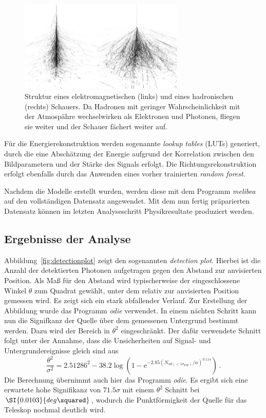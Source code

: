 \begin{figure}
  \centering
  \includegraphics[width=0.7\textwidth]{figures/gamma_hadron.png}
  \caption{Struktur eines elektromagnetischen (links) und eines hadronischen
  (rechts) Schauers. Da Hadronen mit geringer Wahrscheinlichkeit mit der
  Atmospähre wechselwirken als Elektronen und Photonen, fliegen sie weiter und
  der Schauer fächert weiter auf.}
  \label{fig:gamma_hadron}
\end{figure}

Für die Energierekonstruktion werden sogenannte \textit{lookup tables} (LUTs)
generiert, durch die eine Abschätzung der Energie aufgrund der Korrelation
zwischen den Bildparametern und der Stärke des Signals erfolgt. Die
Richtungsrekonstruktion erfolgt ebenfalls durch das Anwenden eines vorher
trainierten \textit{random forest}.

Nachdem die Modelle erstellt wurden, werden diese mit dem Programm
\textit{melibea} auf den vollständigen Datensatz angewendet. Mit dem nun fertig
präparierten Datensatz können im letzten Analyseschritt Physikresultate
produziert werden.

\subsection{Ergebnisse der Analyse}

Abbildung~\ref{fig:detectionplot} zeigt den sogenannten \textit{detection plot}.
Hierbei ist die Anzahl der detektierten Photonen aufgetragen gegen den Abstand
zur anvisierten Position. Als Maß für den Abstand wird typischerweise der
eingeschlossene Winkel $\theta$ zum Quadrat gewählt, unter dem relativ zur
anvisierten Position gemessen wird. Es zeigt sich ein stark abfallender Verlauf.
Zur Erstellung der Abbildung wurde das Programm \textit{odie} verwendet. In
einem nächten Schritt kann nun die Signifkanz der Quelle über dem gemessenen
Untergrund bestimmt werden. Dazu wird der Bereich in $\theta^2$ eingeschränkt.
Der dafür verwendete Schnitt folgt unter der Annahme, dass die Unsicherheiten
auf Signal- und Untergrundereignisse gleich sind aus
%
\begin{equation}
    \frac{\theta^2}{\sigma^2} = 2.51286^2-38.2\log\left(1-\text{e}^{-2.85(N_{\text{off}(<1\sigma_\text{PSF})}/\alpha)^{0.114}}\right) \, .
\end{equation}
%
Die Berechnung übernimmt auch hier das Programm \textit{odie}. Es ergibt sich
eine erwartete hohe Signifikanz von $\num{71.5}\sigma$ mit einem $\theta^2$
Schnitt bei $\SI{0.0103}{deg\squared}$, wodurch die Punktförmigkeit der Quelle
für das Teleskop nochmal deutlich wird.

